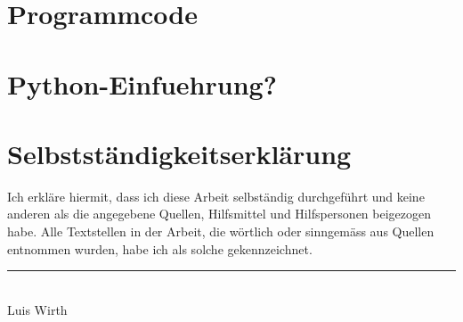 
\begin{appendices}
\chapter{Programmcode}

\chapter{Python-Einfuehrung?}

\end{appendices}

\printbibliography[heading=bibintoc]
\pagebreak

\listoffigures
\pagebreak

\listoftables
\pagebreak

\chapter*{Selbstständigkeitserklärung}
Ich erkläre hiermit, dass ich diese Arbeit selbständig durchgeführt und keine anderen als die angegebene Quellen, Hilfsmittel und Hilfspersonen beigezogen habe. Alle Textstellen in der Arbeit, die wörtlich oder sinngemäss aus Quellen entnommen wurden, habe ich als solche gekennzeichnet.

\vspace{2cm}
\begin{center}
  \noindent\rule{5cm}{0.4pt}\\
  Luis Wirth
\end{center}


